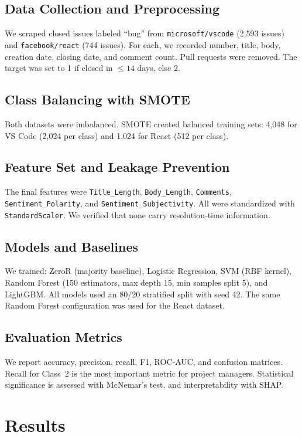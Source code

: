 \documentclass[conference]{IEEEtran}
\begin{document}
\subsection{Data Collection and Preprocessing}
We scraped closed issues labeled ``bug'' from \texttt{microsoft/vscode} (2,593 issues) and \texttt{facebook/react} (744 issues). For each, we recorded number, title, body, creation date, closing date, and comment count. Pull requests were removed. The target was set to 1 if closed in $\le 14$ days, else 2.

\subsection{Class Balancing with SMOTE}
Both datasets were imbalanced. SMOTE created balanced training sets: 4,048 for VS Code (2,024 per class) and 1,024 for React (512 per class).

\subsection{Feature Set and Leakage Prevention}
The final features were \texttt{Title\_Length}, \texttt{Body\_Length}, \texttt{Comments}, \texttt{Sentiment\_Polarity}, and \texttt{Sentiment\_Subjectivity}. All were standardized with \texttt{StandardScaler}. We verified that none carry resolution‑time information.

\subsection{Models and Baselines}
We trained: ZeroR (majority baseline), Logistic Regression, SVM (RBF kernel), Random Forest (150 estimators, max depth 15, min samples split 5), and LightGBM. All models used an 80/20 stratified split with seed 42. The same Random Forest configuration was used for the React dataset.

\subsection{Evaluation Metrics}
We report accuracy, precision, recall, F1, ROC‑AUC, and confusion matrices. Recall for Class~2 is the most important metric for project managers. Statistical significance is assessed with McNemar's test, and interpretability with SHAP.

\section{Results}
\end{document}
